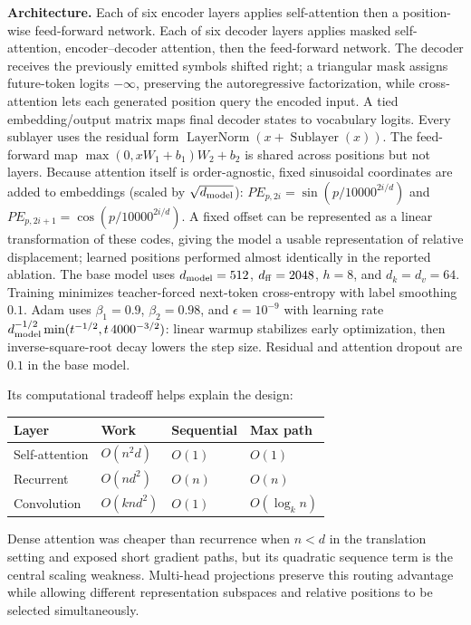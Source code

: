 \documentclass[10pt,letterpaper,twocolumn]{article}
\newcommand{\pehead}[1]{\textbf{#1.}\hspace{0.30em}}
\begin{document}
\pehead{Architecture} Each of six encoder layers applies self-attention then a position-wise feed-forward network. Each of six decoder layers applies masked self-attention, encoder--decoder attention, then the feed-forward network. The decoder receives the previously emitted symbols shifted right; a triangular mask assigns future-token logits $-\infty$, preserving the autoregressive factorization, while cross-attention lets each generated position query the encoded input. A tied embedding/output matrix maps final decoder states to vocabulary logits. Every sublayer uses the residual form $\operatorname{LayerNorm}(x+\operatorname{Sublayer}(x))$. The feed-forward map $\max(0,xW_1+b_1)W_2+b_2$ is shared across positions but not layers. Because attention itself is order-agnostic, fixed sinusoidal coordinates are added to embeddings (scaled by $\sqrt{d_{\rm model}}$): $PE_{p,2i}=\sin(p/10000^{2i/d})$ and $PE_{p,2i+1}=\cos(p/10000^{2i/d})$. A fixed offset can be represented as a linear transformation of these codes, giving the model a usable representation of relative displacement; learned positions performed almost identically in the reported ablation. The base model uses $d_{\rm model}=512$, $d_{\rm ff}=2048$, $h=8$, and $d_k=d_v=64$. Training minimizes teacher-forced next-token cross-entropy with label smoothing $0.1$. Adam uses $\beta_1=0.9$, $\beta_2=0.98$, and $\epsilon=10^{-9}$ with learning rate $d_{\rm model}^{-1/2}\min(t^{-1/2},t\,4000^{-3/2})$: linear warmup stabilizes early optimization, then inverse-square-root decay lowers the step size. Residual and attention dropout are $0.1$ in the base model.

Its computational tradeoff helps explain the design:
\begin{center}
\begin{tabularx}{\columnwidth}{@{}lXXX@{}}
\toprule
Layer & Work & Sequential & Max path\\
\midrule
Self-attention & $O(n^2d)$ & $O(1)$ & $O(1)$\\
Recurrent & $O(nd^2)$ & $O(n)$ & $O(n)$\\
Convolution & $O(knd^2)$ & $O(1)$ & $O(\log_k n)$\\
\bottomrule
\end{tabularx}
\end{center}
Dense attention was cheaper than recurrence when $n<d$ in the translation setting and exposed short gradient paths, but its quadratic sequence term is the central scaling weakness. Multi-head projections preserve this routing advantage while allowing different representation subspaces and relative positions to be selected simultaneously.
\end{document}
